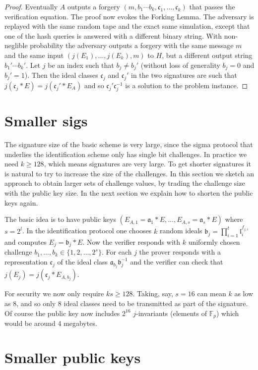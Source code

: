 \documentclass{llncs}
\newcommand{\F}{\mathbb{F}}
\renewcommand{\a}{\mathfrak{a}}
\renewcommand{\b}{\mathfrak{b}}
\renewcommand{\c}{\mathfrak{c}}
\renewcommand{\l}{\mathfrak{l}}
\begin{document}
\begin{proof}
Eventually $A$ outputs a forgery $(m, b_1\cdots b_k, \c_1, \dots, \c_k)$ that passes the verification equation.
The proof now evokes the Forking Lemma. The adversary is replayed with the same random tape and the exact same simulation, except that one of the hash queries is answered with a different binary string.
With non-neglible probability the adversary outputs a forgery with the same message $m$ and the same input $(j(E_1), \dots, j(E_k), m)$ to $H$, but a different output string $b_1'\cdots b_k'$. Let $j$ be an index such that $b_j \ne b_j'$ (without loss of generality $b_j = 0$ and $b_j' = 1$). Then the ideal classes $\c_j$ and $\c_j'$ in the two signatures are such that $j( \c_j * E ) = j( \c_j' * E_A )$ and so $\c_j' \c_j^{-1}$ is a solution to the problem instance.
\end{proof}




\section{Smaller sigs}


The signature size of the basic scheme is very large, since the sigma protocol that underlies the identification scheme only has single bit challenges. 
In practice we need $k \ge 128$, which means signatures are very large.
To get shorter signatures it is natural to try to increase the size of the challenges.
In this section we sketch an approach to obtain larger sets of challenge values, by trading the challenge size with the public key size. In the next section we explain how to shorten the public keys again.


The basic idea is to have public keys $( E_{A,1} = \a_1 * E , \dots , E_{A,s} = \a_s * E )$ where $s = 2^l$.
In the identification protocol one chooses $k$ random ideals $\b_j = \prod_{i=1}^t \l_i^{f_{j,i}}$ and computes $E_j = \b_j * E$.
Now the verifier responds with $k$ uniformly chosen challenge $b_1, \dots, b_k \in \{1, 2, \dots, 2^s \}$.
For each $j$ the prover responds with a representation $\c_j$ of the ideal class $\a_{b_j} \b_j^{-1}$ and the verifier can check that $j( E_j ) = j( \c_j * E_{A, b_j})$.

For security we now only require $ks \ge 128$. Taking, say, $s = 16$ can mean $k$ as low as 8, and so only 8 ideal classes need to be transmitted as part of the signature.
Of course the public key now includes $2^{16}$ $j$-invariants (elements of $\F_p$) which would be around 4 megabytes.


\section{Smaller public keys}




\end{document}
